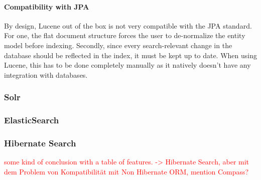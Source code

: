\paragraph{Compatibility with JPA}
By design, Lucene out of the box is not very compatible with the JPA standard. For one, the flat document structure forces the user to de-normalize the entity model before indexing. Secondly, since every search-relevant change in the database should be reflected in the index, it must be kept up to date. When using Lucene, this has to be done completely manually as it natively doesn't have any integration with databases.

\subsubsection{Solr}

\subsubsection{ElasticSearch}

\subsubsection{Hibernate Search}

\textcolor{red}{some kind of conclusion with a table of features. -> Hibernate Search, aber mit dem Problem von Kompatibilität mit Non Hibernate ORM, mention Compass?}

\pagebreak